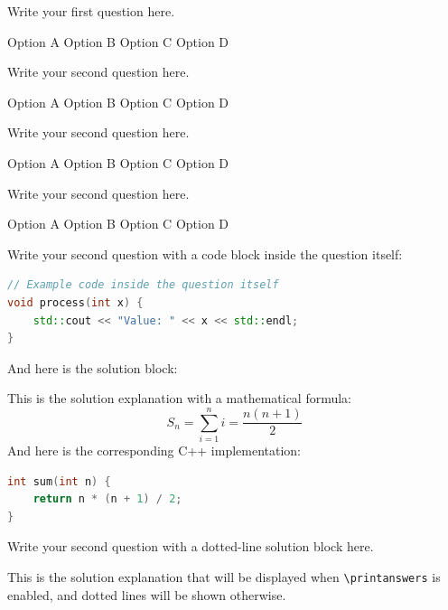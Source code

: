 \documentclass[a4paper,14pt,oneside]{hcmusquiz}
\begin{document}
\addnamebox


\begin{questions}
    \addpoints
    \question[1] Write your first question here.
    \begin{choices}
        \correctchoice Option A
        \choice Option B
        \choice Option C
        \choice Option D
    \end{choices}
    
    \question[1] Write your second question here.

    \begin{oneparchoices}
        \choice Option A
        \correctchoice Option B
        \choice Option C
        \choice Option D
    \end{oneparchoices}
    
    \question[1] Write your second question here.

    \begin{oneparchoices}
        \choice Option A
        \choice Option B
        \correctchoice Option C
        \choice Option D
    \end{oneparchoices}

    \question[1] Write your second question here.

    \begin{oneparchoices}
        \choice Option A
        \choice Option B
        \choice Option C
        \correctchoice Option D
    \end{oneparchoices}

    \question[1] Write your second question with a code block inside the question itself:
\begin{lstlisting}[language=C++]
// Example code inside the question itself
void process(int x) {
    std::cout << "Value: " << x << std::endl;
}
\end{lstlisting}
    And here is the solution block:
    \begin{solution}
        This is the solution explanation with a mathematical formula:
        \[
        S_n = \sum_{i=1}^{n} i = \frac{n(n + 1)}{2}
        \]
        And here is the corresponding C++ implementation:
\begin{lstlisting}[language=C++]
int sum(int n) {
    return n * (n + 1) / 2;
}
\end{lstlisting}
    \end{solution}
    
    \question[1] Write your second question with a dotted-line solution block here.
    \begin{solutionordottedlines}[1.5cm]
        This is the solution explanation that will be displayed when \texttt{\textbackslash printanswers} is enabled, and dotted lines will be shown otherwise.
    \end{solutionordottedlines}


\end{questions}
\end{document}
